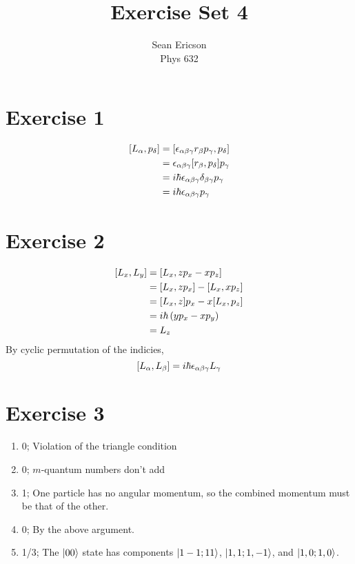 \documentclass[12pt]{article}
\begin{document}
	
\title{Exercise Set 4}
\author{Sean Ericson \\ Phys 632}
\maketitle

\section*{Exercise 1}
\begin{align*}
    \comm{L_\alpha}{p_\delta} & = \comm{\epsilon_{\alpha\beta\gamma}r_\beta p_\gamma}{p_\delta} \\
    & = \epsilon_{\alpha\beta\gamma} \comm{r_\beta}{p_\delta}p_\gamma \\
    & = i\hbar\epsilon_{\alpha\beta\gamma}\delta_{\beta\gamma}p_\gamma \\
    & = i\hbar \epsilon_{\alpha\beta\gamma} p_\gamma
\end{align*}

\section*{Exercise 2}
\begin{align*}
    \comm{L_x}{L_y} & = \comm{L_x}{zp_x - xp_z} \\
    & = \comm{L_x}{zp_x} - \comm{L_x}{xp_z} \\
    & = \comm{L_x}{z}p_x - x\comm{L_x}{p_z} \\
    & = i\hbar\left(yp_x - xp_y\right) \\
    & = L_z
\end{align*}
By cyclic permutation of the indicies,
\[ \comm{L_\alpha}{L_\beta} = i\hbar \epsilon_{\alpha\beta\gamma} L_\gamma \]

\section*{Exercise 3}
\begin{enumerate}[label=(\alph*)]
    \item 0; Violation of the triangle condition
    \item 0; $m$-quantum numbers don't add
    \item 1; One particle has no angular momentum, so the combined momentum must be that of the other.
    \item 0; By the above argument.
    \item 1/3; The $\ket{00}$ state has components $\ket{1 -1; 1 1}$, $\ket{1, 1; 1, -1}$, and $\ket{1, 0; 1, 0}$.
\end{enumerate}
\end{document}
